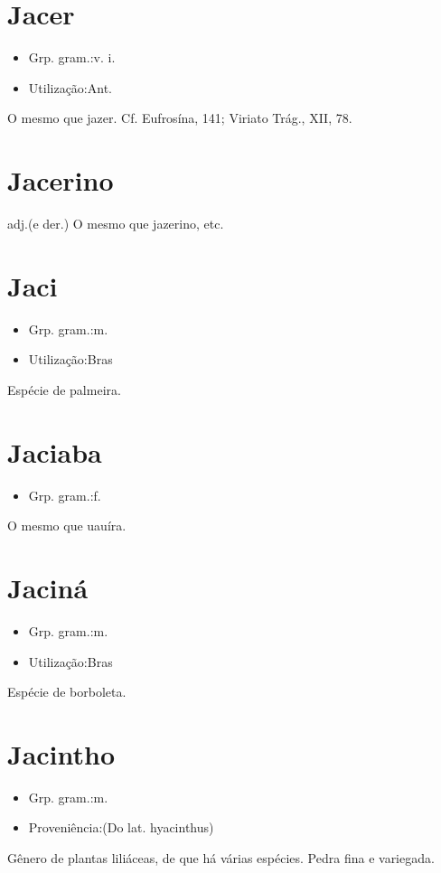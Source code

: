 \documentclass{article}
\begin{document}
\section{Jacer}
\begin{itemize}
\item {Grp. gram.:v. i.}
\end{itemize}
\begin{itemize}
\item {Utilização:Ant.}
\end{itemize}
O mesmo que \textunderscore jazer\textunderscore . Cf. \textunderscore Eufrosína\textunderscore , 141; \textunderscore Viriato Trág.\textunderscore , XII, 78.
\section{Jacerino}
\textunderscore adj.\textunderscore  (e der.)
O mesmo que \textunderscore jazerino\textunderscore , etc.
\section{Jaci}
\begin{itemize}
\item {Grp. gram.:m.}
\end{itemize}
\begin{itemize}
\item {Utilização:Bras}
\end{itemize}
Espécie de palmeira.
\section{Jaciaba}
\begin{itemize}
\item {Grp. gram.:f.}
\end{itemize}
O mesmo que \textunderscore uauíra\textunderscore .
\section{Jaciná}
\begin{itemize}
\item {Grp. gram.:m.}
\end{itemize}
\begin{itemize}
\item {Utilização:Bras}
\end{itemize}
Espécie de borboleta.
\section{Jacintho}
\begin{itemize}
\item {Grp. gram.:m.}
\end{itemize}
\begin{itemize}
\item {Proveniência:(Do lat. \textunderscore hyacinthus\textunderscore )}
\end{itemize}
Gênero de plantas liliáceas, de que há várias espécies.
Pedra fina e variegada.
\end{document}
